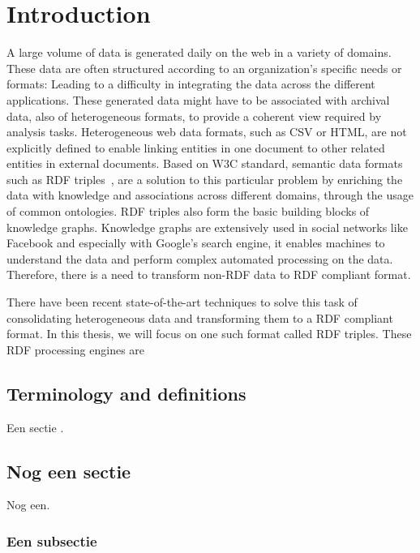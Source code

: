 \chapter{Introduction}

A large volume of data is generated daily on the web in a variety of domains. These
data are often structured according to an organization's specific needs or formats: Leading to
a difficulty in integrating the data across the different applications.
These generated data might have to be associated with archival data, also of heterogeneous formats,
to provide a coherent view required by analysis tasks. Heterogeneous web data formats, such as CSV or HTML, are not explicitly
defined to enable linking entities in one document to other related entities in external documents.
Based on W3C standard, semantic data formats such as RDF triples~\cite{intro_rdf}, are a solution to
this particular problem by enriching the data with knowledge and associations across
different domains, through the usage of common ontologies. RDF triples also form the basic building blocks of knowledge graphs.
Knowledge graphs are extensively used in social networks like Facebook\cite{facebook_linked_data} and especially with Google's search
engine\cite{google_kg}, it enables machines to understand the data and perform complex automated processing
on the data. Therefore, there is a need to transform non-RDF data to RDF compliant format.

There have been recent state-of-the-art techniques to solve this task of consolidating heterogeneous data
and transforming them to a RDF compliant format. In this thesis, we will focus on one such format called RDF triples.
These RDF processing engines are


\section{Terminology and definitions}

Een sectie \cite{graph_of_things}.

\section{Nog een sectie}
\label{sec:nogeensectie}

Nog een.

\subsection{Een subsectie}
